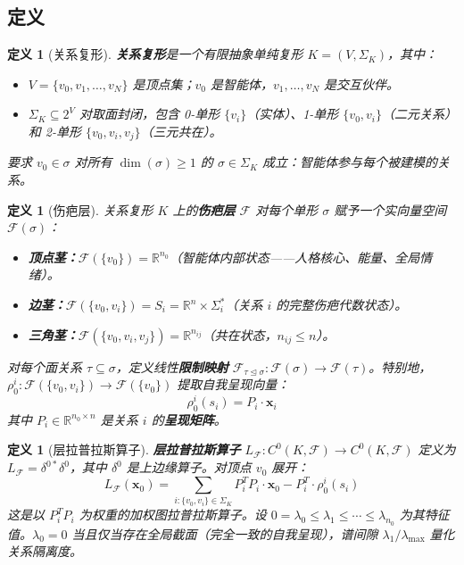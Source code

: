 \documentclass[11pt]{article}
\newtheorem{definition}[theorem]{定义}
\begin{document}
\subsection{定义}

\begin{definition}[关系复形]
\label{def:relational-complex}
\textbf{关系复形}是一个有限抽象单纯复形 $K = (V, \Sigma_K)$，其中：
\begin{itemize}
\item $V = \{v_0, v_1, \ldots, v_N\}$ 是顶点集；$v_0$ 是智能体，$v_1, \ldots, v_N$ 是交互伙伴。
\item $\Sigma_K \subseteq 2^V$ 对取面封闭，包含 0-单形 $\{v_i\}$（实体）、1-单形 $\{v_0, v_i\}$（二元关系）和 2-单形 $\{v_0, v_i, v_j\}$（三元共在）。
\end{itemize}
要求 $v_0 \in \sigma$ 对所有 $\dim(\sigma) \geq 1$ 的 $\sigma \in \Sigma_K$ 成立：智能体参与每个被建模的关系。
\end{definition}

\begin{definition}[伤疤层]
\label{def:scar-sheaf}
关系复形 $K$ 上的\textbf{伤疤层} $\mathcal{F}$ 对每个单形 $\sigma$ 赋予一个实向量空间 $\mathcal{F}(\sigma)$：
\begin{itemize}
\item \textbf{顶点茎：}$\mathcal{F}(\{v_0\}) = \mathbb{R}^{n_0}$（智能体内部状态——人格核心、能量、全局情绪）。
\item \textbf{边茎：}$\mathcal{F}(\{v_0, v_i\}) = S_i = \mathbb{R}^n \times \Sigma_i^*$（关系 $i$ 的完整伤疤代数状态）。
\item \textbf{三角茎：}$\mathcal{F}(\{v_0, v_i, v_j\}) = \mathbb{R}^{n_{ij}}$（共在状态，$n_{ij} \leq n$）。
\end{itemize}
对每个面关系 $\tau \subseteq \sigma$，定义线性\textbf{限制映射} $\mathcal{F}_{\tau \trianglelefteq \sigma}: \mathcal{F}(\sigma) \to \mathcal{F}(\tau)$。特别地，$\rho_0^i: \mathcal{F}(\{v_0, v_i\}) \to \mathcal{F}(\{v_0\})$ 提取自我呈现向量：
\begin{equation}
\rho_0^i(s_i) = P_i \cdot \mathbf{x}_i
\end{equation}
其中 $P_i \in \mathbb{R}^{n_0 \times n}$ 是关系 $i$ 的\textbf{呈现矩阵}。
\end{definition}

\begin{definition}[层拉普拉斯算子]
\label{def:sheaf-laplacian}
\textbf{层拉普拉斯算子} $L_\mathcal{F}: C^0(K, \mathcal{F}) \to C^0(K, \mathcal{F})$ 定义为 $L_\mathcal{F} = \delta^{0*}\delta^0$，其中 $\delta^0$ 是上边缘算子。对顶点 $v_0$ 展开：
\begin{equation}
L_\mathcal{F}(\mathbf{x}_0) = \sum_{i: \{v_0, v_i\} \in \Sigma_K} P_i^T P_i \cdot \mathbf{x}_0 - P_i^T \cdot \rho_0^i(s_i)
\end{equation}
这是以 $P_i^T P_i$ 为权重的加权图拉普拉斯算子。设 $0 = \lambda_0 \leq \lambda_1 \leq \cdots \leq \lambda_{n_0}$ 为其特征值。$\lambda_0 = 0$ 当且仅当存在全局截面（完全一致的自我呈现），谱间隙 $\lambda_1/\lambda_{\max}$ 量化关系隔离度。
\end{definition}
\end{document}
